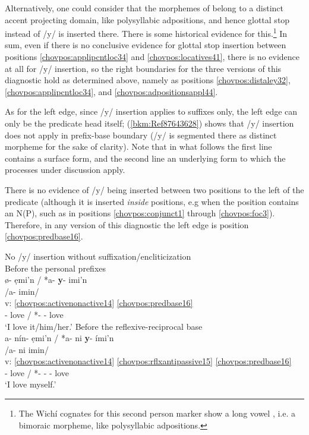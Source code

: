 \documentclass[output=paper]{langscibook}
\begin{document}
Alternatively, one could consider that the morphemes of  belong to a distinct accent projecting domain, like polysyllabic adpositions, and hence glottal stop instead of /y/ is inserted there. There is some historical evidence for this.\footnote{The Wichí cognates for this second person marker show a long vowel \citep{Claesson2016}, i.e. a bimoraic morpheme, like polysyllabic adpositions.} In sum, even if there is no conclusive evidence for glottal stop insertion between positions \ref{chovpos:applipcntloc34} and \ref{chovpos:locatives41}, there is no evidence at all for /y/ insertion, so the right boundaries for the three versions of this diagnostic hold as determined above, namely as positions \ref{chovpos:distaley32}, \ref{chovpos:applipcntloc34}, and \ref{chovpos:adpositionsappl44}.

As for the left edge, since /y/ insertion applies to suffixes only, the left edge can only be the predicate head itself; (\ref{bkm:Ref87643628}) shows that /y/ insertion does not apply in prefix-base boundary (/y/ is segmented there as distinct morpheme for the sake of clarity). Note that in what follows the first line contains a surface form, and the second line an underlying form to which the  processes under discussion apply.

There is no evidence of /y/ being inserted between two positions to the left of the predicate (although it is inserted \textit{inside} positions, e.g when the position contains an N(P), such as in positions \ref{chovpos:conjunct1} through \ref{chovpos:foc3}). Therefore, in any version of this diagnostic the left edge is position \ref{chovpos:predbase16}.

\ea\label{bkm:Ref87643628} No /y/ insertion without suffixation/encliticization\\
    \ea  Before the personal prefixes\\ {
    \gllll {} ø{}- ẹmi'n / *a- \textbf{y}{}- imi'n\\ 
    {} /a- imin/ \\
    v: \ref{chovpos:activenonactive14} \ref{chovpos:predbase16} \\ 
   {} \First{}- love / *\First{}- \Epen{}- love\\
    \glt `I love it/him/her.'
    }
    \ex\label{bkm:Ref89180056} Before the reflexive-reciprocal base\\ {
    \gllll {} a{}- nín{}- ẹmi'n / *a{}- ni \textbf{y}{}- ími'n \\ 
    {} /a{}- ni imin/ \\ 
    v: \ref{chovpos:activenonactive14} \ref{chovpos:rflxantipassive15} \ref{chovpos:predbase16} \\ 
    {} \First{}- \Refl{} love / *\First{}- \Refl{}- \Epen{}- love\\
    \glt `I love myself.'
    }
    \z 
\z 
\end{document}
